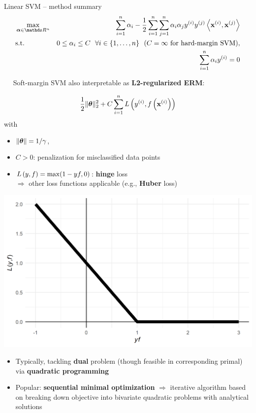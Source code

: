 \begin{vbframe}{Linear SVM -- method summary}
\begin{eqnarray*}
    & \max\limits_{\alphav \in \R^n} & \dualobj \\
    & \text{s.t. } & 0 \le \alpha_i \le C ~~ \forall i \in \nset ~~ (C = \infty
    \text{ for hard-margin SVM)}, \\
    & \quad & \sum_{i=1}^n \alpha_i \yi = 0
\end{eqnarray*}

\medskip

 ~~ Soft-margin SVM also interpretable as 
\textbf{L2-regularized ERM}: 

\begin{minipage}[b]{0.58\textwidth}
  $$ \frac{1}{2} \|\bm{\theta}\|_2^2 + C \sum\limits_{i=1}^n L\left(y^{(i)}, f\left(\mathbf{x}^{(i)}\right)\right)$$ 
  with  
  \begin{itemize}
    \item $\|\bm{\theta}\| = 1 / \gamma$,\\
    \item $C > 0$: penalization for misclassified data points
    \item $L\left(y, f\right) = \max(1-yf, 0)$: \textbf{hinge} loss \\
    $\Rightarrow$ other loss functions applicable (e.g., \textbf{Huber} loss)
  \end{itemize}
\end{minipage}
\begin{minipage}[b]{0.4\textwidth}
  \centering
  \includegraphics[height=0.4\textwidth, keepaspectratio=true]{
  figure/plot-hinge-loss.png}
\end{minipage}

\framebreak


\begin{itemize}
  \item Typically, tackling \textbf{dual} problem (though feasible 
  in corresponding primal) via \textbf{quadratic programming}
  \item Popular: \textbf{sequential minimal optimization} $\Rightarrow$ 
  iterative algorithm based on breaking down objective into bivariate quadratic 
  problems with analytical solutions
\end{itemize}
\medskip


\end{vbframe}
